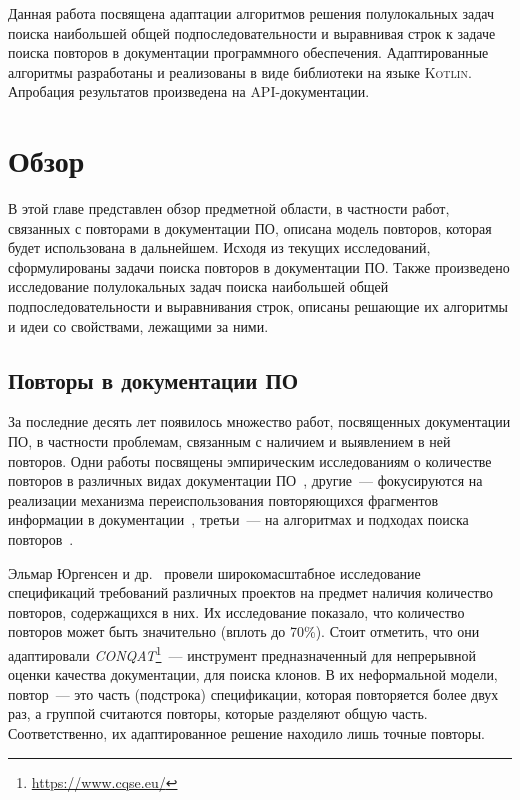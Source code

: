 Данная работа посвящена адаптации алгоритмов решения полулокальных задач поиска наибольшей общей подпоследовательности и выравнивая строк к задаче поиска повторов в документации программного обеспечения.
Адаптированные алгоритмы разработаны и реализованы в виде библиотеки на языке \textsc{Kotlin}.
Апробация результатов произведена на {API}-документации.


\section{Обзор}
В этой главе представлен обзор предметной области, в частности работ, связанных с повторами в документации ПО, описана модель повторов, которая будет использована в дальнейшем. 
Исходя из текущих исследований, сформулированы задачи поиска повторов в документации ПО.
Также произведено исследование полулокальных задач поиска наибольшей общей подпоследовательности и выравнивания строк, описаны решающие их алгоритмы и идеи со свойствами, лежащими за ними.

\subsection{Повторы в документации ПО}\label{duplicateReport}

За последние десять лет появилось множество работ, посвященных документации ПО, в частности проблемам, связанным с наличием и выявлением в ней повторов.
Одни работы посвящены эмпирическим исследованиям о количестве повторов  в различных видах документации ПО~\cite{poruban2016preliminary,juergens2010can,oumaziz2017documentation}, другие~--- фокусируются на реализации механизма переиспользования повторяющихся фрагментов информации в документации~\cite{koznov2015clone,horie2010tool,poruban2014reusable}, третьи~--- на алгоритмах и подходах поиска повторов~\cite{luciv2018detecting,luciv2019interactive,blasi2018replicomment,rago2016identifying, soto2015similarity}.

Эльмар Юргенсен и др.~\cite{juergens2010can} провели широкомасштабное исследование спецификаций требований различных проектов на предмет наличия количество повторов, содержащихся в них. 
Их исследование показало, что количество повторов может быть значительно (вплоть до 70\%). 
Стоит отметить, что они адаптировали \emph{CONQAT}\footnote{\url{https://www.cqse.eu/}}~--- инструмент предназначенный для непрерывной оценки качества документации, для поиска клонов.
В их неформальной модели, повтор~--- это часть (подстрока) спецификации, которая повторяется более двух раз, а группой считаются повторы, которые разделяют общую часть. 
Соответственно, их адаптированное решение находило лишь точные повторы.

